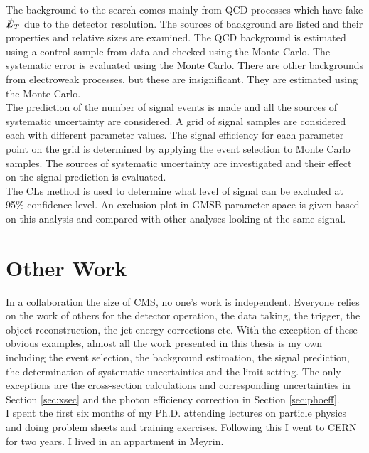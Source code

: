 The background to the search comes mainly from QCD processes which have fake
$\slashed{E}_{T}$ due to the detector resolution. The sources of background are listed 
and their properties and relative sizes are examined. The QCD background is
estimated using a control sample from data and checked using the Monte Carlo.
The systematic error is evaluated using the Monte Carlo. There are other
backgrounds from electroweak processes, but these are insignificant. They are
estimated using the Monte Carlo. \\

The prediction of the number of signal events is made and all the sources of
systematic uncertainty are considered. A grid of signal samples are considered
each with different parameter values. The signal efficiency for each parameter
point on the grid is determined by applying the event selection to Monte Carlo 
samples. The sources of systematic uncertainty are investigated and their effect
on the signal prediction is evaluated. \\

The CLs method is used to determine what level of signal can be excluded at 95\%
confidence level. An exclusion plot in GMSB parameter space is given based on
this analysis and compared with other analyses looking at the same signal.

\section{Other Work}

In a collaboration the size of CMS, no one's work is independent. Everyone
relies on the work of others for the detector operation, the data taking, the
trigger, the object reconstruction, the jet energy corrections etc. With the
exception of these obvious examples, almost all the work presented in this 
thesis is my own including the event selection, the background estimation, the
signal prediction, the determination of systematic uncertainties and the limit
setting. The only exceptions are the cross-section calculations and 
corresponding uncertainties in Section \ref{sec:xsec} and the photon efficiency
correction in Section \ref{sec:phoeff}. \\

I spent the first six months of my Ph.D. attending lectures on particle physics 
and doing problem sheets and training exercises. Following this I went to CERN
for two years. I lived in an appartment in Meyrin. \\

